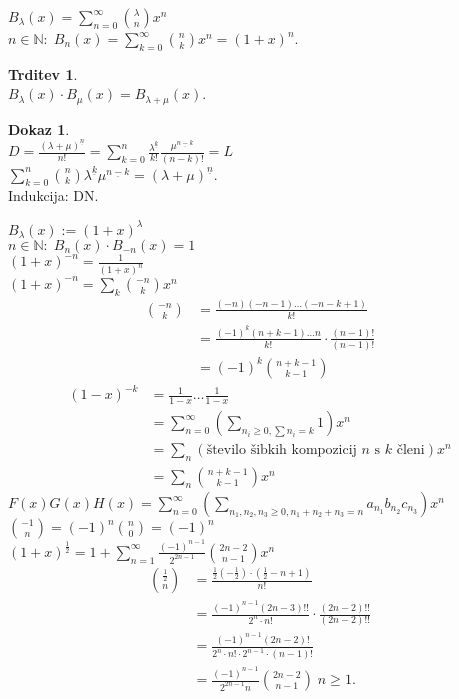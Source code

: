 \documentclass[a4paper, 12pt]{book}
\theoremstyle{definition}
\newtheorem{claim}[counter]{Trditev}
\newtheorem{pro}[counter]{Dokaz}
\theoremstyle{remark}
\newcommand{\N}{\mathbb{N}}
\begin{document}
$B_{\lambda}(x) = \sum_{n=0}^{\infty} \binom{\lambda}{n} x^n$ \\
$n \in \N: \; B_n(x) = \sum_{k=0}^{\infty} \binom{n}{k} x^n = (1+x)^n$. \\
\begin{claim} \text{} \\
  $B_{\lambda}(x) \cdot B_{\mu}(x) = B_{\lambda + \mu}(x)$.
\end{claim}
\begin{pro} \text{} \\
  $D = \frac{(\lambda + \mu)^{\underline{n}}}{n!} =
    \sum_{k=0}^{n}\frac{\lambda^{\underline{k}}}{k!} \frac{\mu^{\underline{n-k}}}{(n-k)!} = L$ \\
  $\sum_{k=0}^{n} \binom{n}{k} \lambda^{\underline{k}} \mu^{\underline{n-k}} = (\lambda + \mu)^{\underline{n}}$. \\
  Indukcija: DN.
\end{pro}
$B_{\lambda}(x) := (1+x)^{\lambda}$ \\
$n \in \N: \; B_n(x) \cdot B_{-n}(x) = 1$ \\
$(1+x)^{-n} = \frac{1}{(1+x)^n}$ \\
$(1+x)^{-n} = \sum_k \binom{-n}{k} x^n$ \\
\begin{align*}
  \binom{-n}{k} &= \frac{(-n) (-n-1) \dots (-n-k+1)}{k!} \\
  &= \frac{(-1)^k (n+k-1) \dots n}{k!} \cdot \frac{(n-1)!}{(n-1)!} \\
  &= (-1)^k \binom{n+k-1}{k-1}
\end{align*}
\begin{align*}
  (1-x)^{-k} &= \frac{1}{1-x} \dots \frac{1}{1-x} \\
  &= \sum_{n=0}^{\infty} \left(\sum_{n_i \geq 0, \sum n_i = k} 1 \right) x^n \\
  &= \sum_n (\text{število šibkih kompozicij } n \text{ s } k \text{ členi}) x^n \\
  &= \sum_n \binom{n+k-1}{k-1} x^n
\end{align*}
$F(x) G(x) H(x) = \sum_{n=0}^{\infty} \left(\sum_{n_1, n_2, n_3 \geq 0, n_1 + n_2 + n_3 = n} a_{n_1} b_{n_2} c_{n_3}\right) x^n$ \\
$\binom{-1}{n} = (-1)^n \binom{n}{0} = (-1)^n$ \\
$(1+x)^{\frac{1}{2}} = 1 + \sum_{n=1}^{\infty} \frac{(-1)^{n-1}}{2^{2n-1}} \binom{2n-2}{n-1} x^n$ \\
\begin{align*}
  \binom{\frac{1}{2}}{n} &= \frac{\frac{1}{2} \left(-\frac{1}{2}\right) \cdot \left(\frac{1}{2}-n+1\right)}{n!} \\
  &= \frac{(-1)^{n-1} (2n-3)!!}{2^n \cdot n!} \cdot \frac{(2n-2)!!}{(2n-2)!!} \\
  &= \frac{(-1)^{n-1} (2n-2)!}{2^n \cdot n! \cdot 2^{n-1} \cdot (n-1)!} \\
  &= \frac{(-1)^{n-1}}{2^{2n-1} n} \binom{2n-2}{n-1} \; n \geq 1.
\end{align*}
\end{document}
